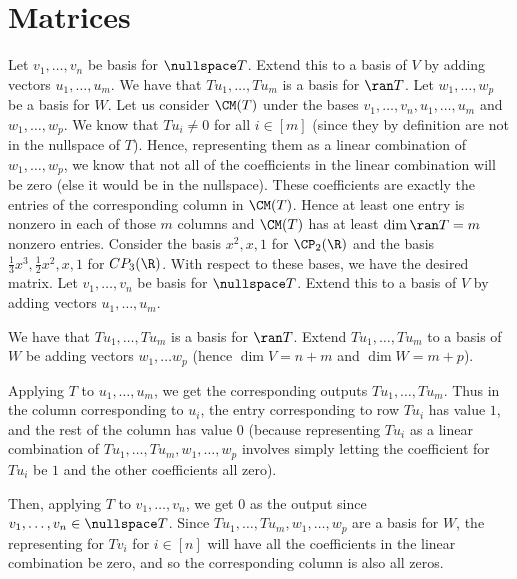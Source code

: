 \documentclass{book}
\begin{document}
\section{Matrices}
  \begin{enumerate}[label=\arabic*)]
    \ii 
      Let $v_1, \dots, v_n$ be basis for $\nullspace T$. Extend this to a basis of $V$ by adding vectors $u_1, \dots, u_m$. We have that $Tu_1, \dots, Tu_m$ is a basis for $\ran T$. Let
      $w_1, \dots, w_p$ be a basis for $W$. Let us consider $\CM(T)$ under the bases $v_1, \dots, v_n, u_1, \dots, u_m$ and $w_1, \dots, w_p$. We know that $Tu_i \neq 0$ for all $i \in [m]$
      (since they by definition are not in the nullspace of $T$). Hence, representing them as a linear combination of $w_1, \dots, w_p$, we know that not all of the coefficients in the linear
      combination will be zero (else it would be in the nullspace). These coefficients are exactly the entries of the corresponding column in $\CM(T)$. Hence at least one entry is nonzero in
      each of those $m$ columns and $\CM(T)$ has at least $\dim\ran T = m$ nonzero entries.
    \ii 
      Consider the basis $x^2, x, 1$ for $\CP_2(\R)$ and the basis $\frac{1}{3}x^3, \frac{1}{2}x^2, x, 1$ for $CP_3(\R)$. With respect to these bases, we have the desired matrix.
    \ii
      Let $v_1, \dots, v_n$ be basis for $\nullspace T$. Extend this to a basis of $V$ by adding vectors $u_1, \dots, u_m$. 

      We have that $Tu_1, \dots, Tu_m$ is a basis for $\ran T$. Extend $Tu_1, \dots, Tu_m$ to a basis of $W$ be adding vectors $w_1, \dots w_p$ (hence $\dim V = n + m$ and $\dim W = m + p$).
      
      Applying $T$ to $u_1, \dots, u_m$, we get the corresponding outputs $Tu_1, \dots, Tu_m$. Thus in the column corresponding to $u_i$, the entry corresponding to row $Tu_i$ has value $1$,
      and the rest of the column has value $0$ (because representing $Tu_i$ as a linear combination of $Tu_1, \dots, Tu_m, w_1, \dots, w_p$ involves simply letting the coefficient for $Tu_i$
      be $1$ and the other coefficients all zero).

      Then, applying $T$ to $v_1, \dots, v_n$, we get $0$ as the output since $v_1, \dots, v_n \in \nullspace T$. Since $Tu_1, \dots, Tu_m, w_1, \dots, w_p$ are a basis for $W$, the
      representing for $Tv_i$ for $i \in [n]$ will have all the coefficients in the linear combination be zero, and so the corresponding column is also all zeros. 


\end{enumerate}
\end{document}

